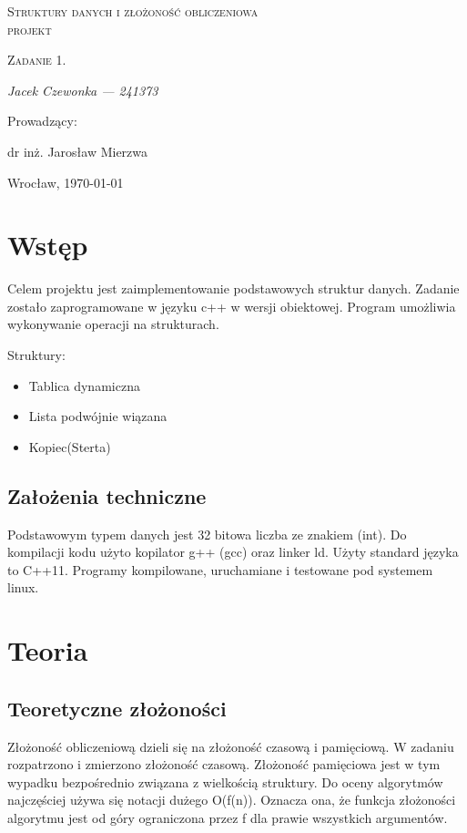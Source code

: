 \documentclass[polish, 11pt]{article}
\begin{document}
\begin{titlepage}
    \centering
    {\scshape\LARGE  Struktury danych i złożoność obliczeniowa \\ projekt \par}
    \vspace{1cm}
    {\scshape\Large Zadanie 1.\par}
    \vspace{2cm}
 
   
    {\itshape\Large Jacek Czewonka  --- 241373\/\par}
    \vfill
    Prowadzący:\par
    dr inż. Jarosław Mierzwa

    \vfill

    {\large Wrocław, \today\par}

\end{titlepage}

\tableofcontents
\newpage

\section{Wstęp}
	Celem projektu jest zaimplementowanie podstawowych struktur danych. Zadanie zostało zaprogramowane w języku c++ w wersji obiektowej. Program umożliwia wykonywanie operacji na strukturach.
	\par Struktury:
\begin{itemize}
	    			\item Tablica dynamiczna
			    	\item Lista podwójnie wiązana
			    	\item Kopiec(Sterta)
\end{itemize}    	
\subsection{Założenia techniczne}
	Podstawowym typem danych jest 32 bitowa liczba ze znakiem (int). Do kompilacji kodu użyto kopilator g++ (gcc) oraz linker ld. Użyty standard języka to C++11.	Programy kompilowane, uruchamiane i testowane pod systemem linux.
\section{Teoria}
 	\subsection{Teoretyczne  złożoności}
 	Złożoność obliczeniową dzieli się na złożoność czasową i pamięciową. W zadaniu rozpatrzono i zmierzono  złożoność czasową. Złożoność pamięciowa jest w tym wypadku bezpośrednio związana z wielkością struktury. Do oceny algorytmów najczęściej używa się notacji dużego O(f(n)). Oznacza ona, że funkcja złożoności algorytmu jest od góry ograniczona przez f dla prawie wszystkich argumentów.
 	
\end{document}
